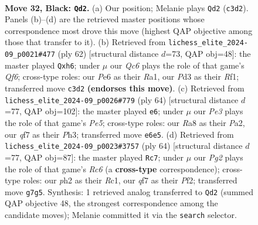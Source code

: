 \documentclass[11pt]{article}
\begin{document}
\clearpage

\begin{figure}[p]\centering
\begin{subfigure}{0.46\textwidth}\centering
\resizebox{\linewidth}{!}{%
\newchessgame
\chessboard[
  setfen={r2r3k/bp1b1Qp1/p3p3/7P/8/BPqp3B/P4PKP/1R2R3 b - - 2 32},
  showmover=false,
  pgfstyle=straightmove, color=movearrow, markmove={c3-d2}
]}
\caption{}
\end{subfigure}\hfill
\begin{subfigure}{0.46\textwidth}\centering
\resizebox{\linewidth}{!}{%
\newchessgame
\chessboard[
  setfen={5rk1/ppn2p2/2p2Q1p/3r3b/3qB2P/8/PP4P1/R4R1K w - - 6 32},
  showmover=false,
  pgfstyle=straightmove, color=movearrow, markmove={f6-h6}
]}
\caption{}
\end{subfigure}
\\[4pt]
\begin{subfigure}{0.46\textwidth}\centering
\resizebox{\linewidth}{!}{%
\newchessgame
\chessboard[
  setfen={4r1k1/4rpb1/6p1/3pP1Qp/pP1B1R2/3q3P/P5P1/5R1K w - - 2 33},
  showmover=false,
  pgfstyle=straightmove, color=movearrow, markmove={e5-e6}
]}
\caption{}
\end{subfigure}\hfill
\begin{subfigure}{0.46\textwidth}\centering
\resizebox{\linewidth}{!}{%
\newchessgame
\chessboard[
  setfen={3rr1k1/5p2/2R2Qpp/p4b2/1q1Pp3/1P5P/5PP1/1BR3K1 w - - 1 33},
  showmover=false,
  pgfstyle=straightmove, color=movearrow, markmove={c6-c7}
]}
\caption{}
\end{subfigure}
\caption{\textbf{Move 32, Black: \texttt{Qd2}.} (a) Our position; Melanie plays \texttt{Qd2} (\texttt{c3d2}). Panels (b)--(d) are the retrieved master positions whose correspondence most drove this move (highest QAP objective among those that transfer to it). (b) Retrieved from \texttt{lichess\_elite\_2024-09\_p0021\#477} (ply 62) [structural distance $d$=73, QAP obj=48]: the master played \texttt{Qxh6}; under $\mu$ our \emph{Qc6} plays the role of that game's \emph{Qf6}; cross-type roles: our \emph{P}e6 as their \emph{R}a1, our \emph{P}d3 as their \emph{R}f1; transferred move \texttt{c3d2} \textbf{(endorses this move)}. (c) Retrieved from \texttt{lichess\_elite\_2024-09\_p0026\#779} (ply 64) [structural distance $d$=77, QAP obj=102]: the master played \texttt{e6}; under $\mu$ our \emph{Pe3} plays the role of that game's \emph{Pe5}; cross-type roles: our \emph{R}a8 as their \emph{P}a2, our \emph{q}f7 as their \emph{P}h3; transferred move \texttt{e6e5}. (d) Retrieved from \texttt{lichess\_elite\_2024-09\_p0023\#3757} (ply 64) [structural distance $d$=77, QAP obj=87]: the master played \texttt{Rc7}; under $\mu$ our \emph{Pg2} plays the role of that game's \emph{Rc6} (a \textbf{cross-type} correspondence); cross-type roles: our \emph{p}h2 as their \emph{R}c1, our \emph{q}f7 as their \emph{P}f2; transferred move \texttt{g7g5}. Synthesis: 1 retrieved analog transferred to \texttt{Qd2} (summed QAP objective 48, the strongest correspondence among the candidate moves); Melanie committed it via the \texttt{search} selector.}
\label{fig:thought-m63}
\end{figure}
\end{document}
